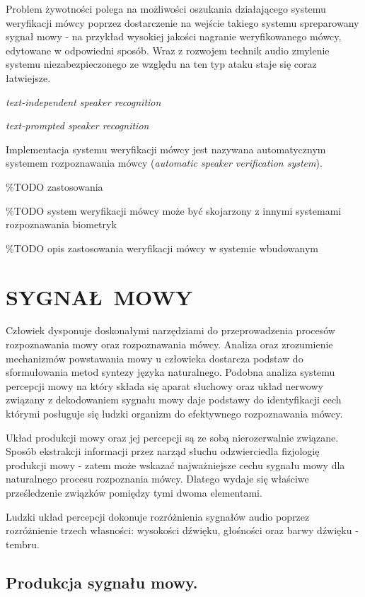 Problem żywotności polega na możliwości oszukania działającego systemu weryfikacji mówcy poprzez dostarczenie na wejście takiego systemu spreparowany sygnał mowy - na przykład wysokiej jakości nagranie weryfikowanego mówcy, edytowane w odpowiedni sposób. Wraz z rozwojem technik audio zmylenie systemu niezabezpieczonego ze względu na ten typ ataku staje się coraz łatwiejsze.

\textit{text-independent speaker recognition} \cite{fosr}

\textit{text-prompted speaker recognition} \cite{fosr}

Implementacja systemu weryfikacji mówcy jest nazywana automatycznym systemem rozpoznawania mówcy (\textit{automatic speaker verification system}).

\%TODO zastosowania 

\%TODO system weryfikacji mówcy może być skojarzony z innymi systemami rozpoznawania biometryk

\%TODO opis zastosowania weryfikacji mówcy w systemie wbudowanym

\section{SYGNAŁ MOWY}


Człowiek dysponuje doskonałymi narzędziami do przeprowadzenia procesów rozpoznawania mowy oraz rozpoznawania mówcy. Analiza oraz zrozumienie mechanizmów powstawania mowy u człowieka dostarcza podstaw do sformułowania metod syntezy języka naturalnego. Podobna analiza systemu percepcji mowy na który składa się aparat słuchowy oraz układ nerwowy związany z dekodowaniem sygnału mowy daje podstawy do identyfikacji cech którymi posługuje się ludzki organizm do efektywnego rozpoznawania mówcy.

Układ produkcji mowy oraz jej percepcji są ze sobą nierozerwalnie związane. Sposób ekstrakcji informacji przez narząd słuchu odzwierciedla fizjologię produkcji mowy - zatem może wskazać najważniejsze cechu sygnału mowy dla naturalnego procesu rozpoznania mówcy. Dlatego wydaje się właściwe prześledzenie związków pomiędzy tymi dwoma elementami.

Ludzki układ percepcji dokonuje rozróżnienia sygnałów audio poprzez rozróżnienie trzech własności: wysokości dźwięku, głośności oraz barwy dźwięku - tembru. 
%
\subsection{Produkcja sygnału mowy.}

